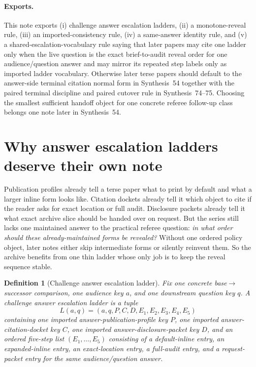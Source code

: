 \documentclass[11pt]{article}
\newtheorem{definition}{Definition}
\begin{document}
\paragraph{Exports.}
This note exports (i) challenge answer escalation ladders, (ii) a monotone-reveal rule, (iii) an imported-consistency rule, (iv) a same-answer identity rule, and (v) a shared-escalation-vocabulary rule saying that later papers may cite one ladder only when the live question is the exact brief-to-audit reveal order for one audience/question answer and may mirror its repeated step labels only as imported ladder vocabulary. Otherwise later terse papers should default to the answer-side terminal citation normal form in Synthesis~54 together with the paired terminal discipline and paired cutover rule in Synthesis~74--75. Choosing the smallest sufficient handoff object for one concrete referee follow-up class belongs one note later in Synthesis~54.\cite{series:challengeanswerreviewmenus,series:pairedterminalcitationdiscipline,series:pairedterminalcutoverrules}

\section{Why answer escalation ladders deserve their own note}
Publication profiles already tell a terse paper what to print by default and what a larger inline form looks like.
Citation dockets already tell it which object to cite if the reader asks for exact location or full audit.
Disclosure packets already tell it what exact archive slice should be handed over on request.
But the series still lacks one maintained answer to the practical referee question: \emph{in what order should these already-maintained forms be revealed?}
Without one ordered policy object, later notes either skip intermediate forms or silently reinvent them.
So the archive benefits from one thin ladder whose only job is to keep the reveal sequence stable.

\begin{definition}[Challenge answer escalation ladder]
Fix one concrete base$\to$successor comparison, one audience key $a$, and one downstream question key $q$.
A \emph{challenge answer escalation ladder} is a tuple
\[
L(a,q)=(a,q,P,C,D,E_1,E_2,E_3,E_4,E_5)
\]
containing one imported answer-publication-profile key $P$, one imported answer-citation-docket key $C$, one imported answer-disclosure-packet key $D$, and an ordered five-step list $(E_1,\dots,E_5)$ consisting of a default-inline entry, an expanded-inline entry, an exact-location entry, a full-audit entry, and a request-packet entry for the same audience/question answer.
\end{definition}
\end{document}
